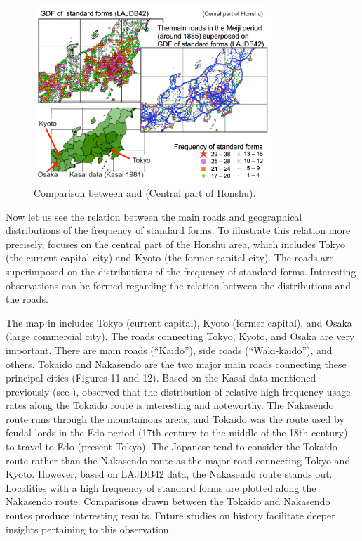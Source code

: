 \documentclass[output=paper]{LSP/langsci}
\begin{document}
\begin{figure}
\includegraphics[width=0.8\textwidth]{illustrations/kuma_fig08}
\caption{Comparison between  and  (Central part of Honshu).}          
\label{fig:8}
\end{figure} 

Now let us see the relation between the main roads and geographical distributions of the frequency of standard forms. To illustrate this relation more precisely,  focuses on the central part of the Honshu area, which includes Tokyo (the current capital city) and Kyoto (the former capital city). The roads are superimposed on the distributions of the frequency of standard forms. Interesting observations can be formed regarding the relation between the distributions and the roads.

\largerpage[2]
The map in  includes Tokyo (current capital), Kyoto (former capital), and Osaka (large commercial city). The roads connecting Tokyo, Kyoto, and Osaka are very important. There are main roads (“Kaido”), side roads (“Waki-kaido”), and others. Tokaido and Nakasendo are the two major main roads connecting these principal cities (Figures 11 and 12). Based on the Kasai data mentioned previously (see ), \citet[184]{tanaka_hyojungo:_1991} observed that the distribution of relative high frequency usage rates along the Tokaido route is interesting and noteworthy. The Nakasendo route runs through the mountainous areas, and Tokaido was the route used by feudal lords in the Edo period (17th century to the middle of the 18th century) to travel to Edo (present Tokyo). The Japanese tend to consider the Tokaido route rather than the Nakasendo route as the major road connecting Tokyo and Kyoto. However, based on LAJDB42 data, the Nakasendo route stands out. Localities with a high frequency of standard forms are plotted along the Nakasendo route. Comparisons drawn between the Tokaido and Nakasendo routes produce interesting results. Future studies on  history facilitate deeper insights pertaining to this observation.
\end{document}
